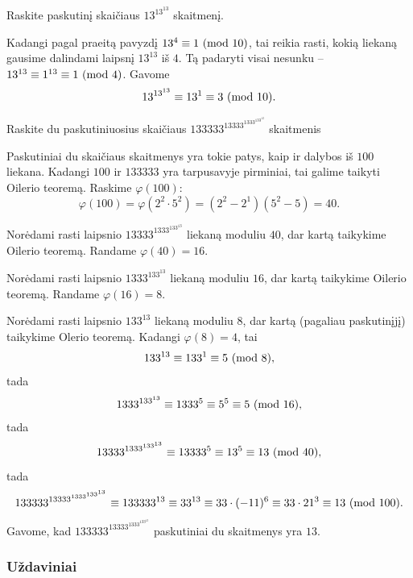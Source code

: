 \begin{pavnr}
  Raskite paskutinį skaičiaus $13^{13^{13}}$ skaitmenį.
\end{pavnr}

\begin{sprendimas}
Kadangi pagal praeitą pavyzdį $13^{4}\equiv 1 \ (\text{mod } 10)$, tai reikia rasti,
kokią liekaną gausime dalindami laipsnį $13^{13}$ iš $4$. Tą padaryti visai
nesunku -- $13^{13} \equiv 1^{13} \equiv 1 \ (\text{mod } 4)$. Gavome
$$13^{13^{13}} \equiv 13^1 \equiv 3 \ (\text{mod } 10).$$
\end{sprendimas}

\begin{pavnr}
  Raskite du paskutiniuosius skaičiaus $133333^{13333^{1333^{133^{13}}}}$
  skaitmenis
\end{pavnr}

\begin{sprendimas}
Paskutiniai du skaičiaus skaitmenys yra tokie patys, kaip ir dalybos iš
$100$ liekana. Kadangi $100$ ir $133333$ yra tarpusavyje pirminiai, tai
galime taikyti Oilerio teoremą. Raskime $\varphi(100)$:
$$\varphi(100) = \varphi(2^2\cdot 5^2) = (2^2-2^1)(5^2-5) = 40.$$

Norėdami rasti laipsnio $13333^{1333^{133^{13}}}$ liekaną moduliu
$40$, dar kartą taikykime Oilerio teoremą. Randame $\varphi(40) = 16$.

Norėdami rasti laipsnio $1333^{133^{13}}$ liekaną moduliu $16$, dar kartą
taikykime Oilerio teoremą. Randame $\varphi(16) = 8$.

Norėdami rasti laipsnio $133^{13}$ liekaną moduliu $8$, dar kartą (pagaliau
paskutinįjį) taikykime Olerio teoremą. Kadangi $\varphi(8) = 4$, tai  
$$133^{13}\equiv 133^1 \equiv 5 \ (\text{mod } 8),$$tada 
$$1333^{133^{13}} \equiv 1333^5 \equiv 5^5 \equiv 5 \ (\text{mod } 16),$$tada
$$13333^{1333^{133^{13}}} \equiv 13333^{5} \equiv 13^5 \equiv 13
\ (\text{mod } 40),$$tada
$$133333^{13333^{1333^{133^{13}}}} \equiv 133333^{13} \equiv 33^{13} \equiv
33\cdot (-11)^{6} \equiv 33\cdot 21^{3} \equiv 13  \ (\text{mod } 100).$$
Gavome, kad $133333^{13333^{1333^{133^{13}}}}$ paskutiniai du skaitmenys
yra $13$. 
\end{sprendimas}

\subsubsection{Uždaviniai}

